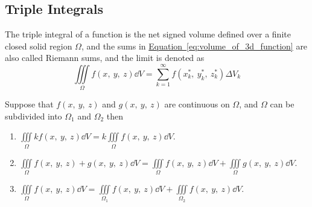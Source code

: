 \documentclass{article}
\begin{document}
\subsection{Triple Integrals}
\begin{definition}
    The triple integral of a function is the net signed volume
    defined over a finite closed solid region \(\Omega\), and the sums in
    \hyperref[eq:volume_of_3d_function]{Equation~\ref{eq:volume_of_3d_function}}
    are also called Riemann sums, and the limit is denoted as
    \begin{equation*}
        \iiint\limits_{\Omega} f(x,\: y,\: z)  \dd{V}
        = \sum_{k=1}^{\infty} f(x_k^\ast,\: y_k^\ast,\: z_k^\ast) \Delta V_k
    \end{equation*}
\end{definition}
\begin{tcolorboxlarge}[title={Properties of Triple Integrals}]
    \begin{theorem}
        Suppose that \(f(x,\: y,\: z) \) and \(g(x,\: y,\: z)\) are continuous on \(\Omega\),
        and \(\Omega\) can be subdivided into \(\Omega_1\) and \(\Omega_2\) then
        \begin{enumerate}[label=\normalfont\alph*)] %
            \item $\displaystyle\iiint\limits_\Omega kf(x,\: y,\: z) \dd{V}
                      = k\iiint\limits_\Omega f(x,\: y,\: z) \dd{V}$.
            \item $\displaystyle\iiint\limits_\Omega f(x,\: y,\: z) + g(x,\: y,\: z) \dd{V}
                      = \iiint\limits_\Omega f(x,\: y,\: z) \dd{V} + \iiint\limits_\Omega g(x,\: y,\: z) \dd{V}$.
            \item $\displaystyle\iiint\limits_\Omega f(x,\: y,\: z) \dd{V}
                      = \iiint\limits_{\Omega_1} f(x,\: y,\: z) \dd{V} + \iiint\limits_{\Omega_2} f(x,\: y,\: z) \dd{V}$.
        \end{enumerate}
    \end{theorem}
\end{tcolorboxlarge}
\newpage
\end{document}
